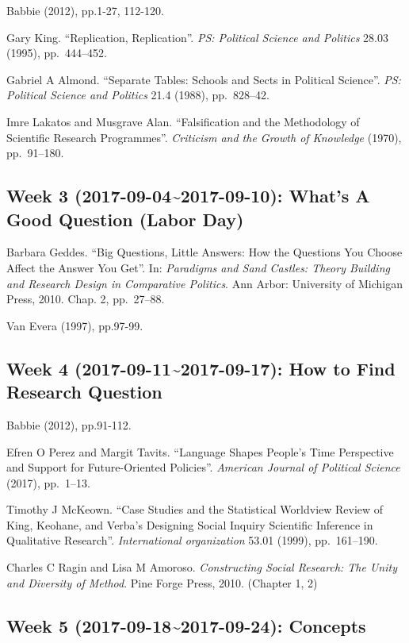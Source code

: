 \documentclass[11pt,]{article}
\theoremstyle{definition}
\theoremstyle{definition}
\theoremstyle{remark}
\begin{document}
Babbie (2012), pp.1-27, 112-120.

Gary King. ``Replication, Replication''.
\emph{PS: Political Science and Politics} 28.03 (1995), pp.~444--452.

Gabriel A Almond. ``Separate Tables: Schools and Sects in Political
Science''. \emph{PS: Political Science and Politics} 21.4 (1988),
pp.~828--42.

Imre Lakatos and Musgrave Alan. ``Falsification and the Methodology of
Scientific Research Programmes''.
\emph{Criticism and the Growth of Knowledge} (1970), pp.~91--180.

\subsection{Week 3 (2017-09-04\textasciitilde{}2017-09-10): What's A
Good Question (Labor
Day)}\label{week-3-2017-09-042017-09-10-whats-a-good-question-labor-day}

Barbara Geddes. ``Big Questions, Little Answers: How the Questions You
Choose Affect the Answer You Get''. In:
\emph{Paradigms and Sand Castles: Theory Building and Research Design in Comparative Politics}.
Ann Arbor: University of Michigan Press, 2010. Chap. 2, pp.~27--88.

Van Evera (1997), pp.97-99.

\subsection{Week 4 (2017-09-11\textasciitilde{}2017-09-17): How to Find
Research
Question}\label{week-4-2017-09-112017-09-17-how-to-find-research-question}

Babbie (2012), pp.91-112.

Efren O Perez and Margit Tavits. ``Language Shapes People's Time
Perspective and Support for Future-Oriented Policies''.
\emph{American Journal of Political Science} (2017), pp.~1--13.

Timothy J McKeown. ``Case Studies and the Statistical Worldview Review
of King, Keohane, and Verba's Designing Social Inquiry Scientific
Inference in Qualitative Research''. \emph{International organization}
53.01 (1999), pp.~161--190.

Charles C Ragin and Lisa M Amoroso.
\emph{Constructing Social Research: The Unity and Diversity of Method}.
Pine Forge Press, 2010. (Chapter 1, 2)

\subsection{Week 5 (2017-09-18\textasciitilde{}2017-09-24):
Concepts}\label{week-5-2017-09-182017-09-24-concepts}
\end{document}
